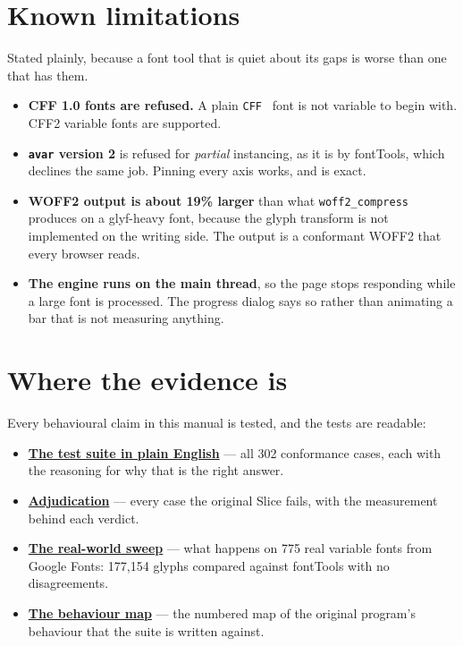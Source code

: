\documentclass[11pt,a4paper]{article}
\begin{document}
\section{Known limitations}

Stated plainly, because a font tool that is quiet about its gaps is worse than one that has them.

\begin{itemize}
  \item \textbf{CFF 1.0 fonts are refused.} A plain \texttt{CFF } font is not variable to begin with. CFF2 variable fonts are supported.
  \item \textbf{\texttt{avar} version 2} is refused for \emph{partial} instancing, as it is by fontTools, which declines the same job. Pinning every axis works, and is exact.
  \item \textbf{WOFF2 output is about 19\% larger} than what \texttt{woff2\_compress} produces on a glyf-heavy font, because the glyph transform is not implemented on the writing side. The output is a conformant WOFF2 that every browser reads.
  \item \textbf{The engine runs on the main thread}, so the page stops responding while a large font is processed. The progress dialog says so rather than animating a bar that is not measuring anything.
\end{itemize}

\section{Where the evidence is}

Every behavioural claim in this manual is tested, and the tests are readable:

\begin{itemize}
  \item \textbf{\href{https://googlefonts.github.io/slice-web/test-suite.html}{The test suite in plain English}} --- all 302 conformance cases, each with the reasoning for why that is the right answer.
  \item \textbf{\href{https://googlefonts.github.io/slice-web/adjudication.html}{Adjudication}} --- every case the original Slice fails, with the measurement behind each verdict.
  \item \textbf{\href{https://googlefonts.github.io/slice-web/real-world-sweep.html}{The real-world sweep}} --- what happens on 775 real variable fonts from Google Fonts: 177,154 glyphs compared against fontTools with no disagreements.
  \item \textbf{\href{https://googlefonts.github.io/slice-web/original-behaviour.html}{The behaviour map}} --- the numbered map of the original program's behaviour that the suite is written against.
\end{itemize}
\end{document}
